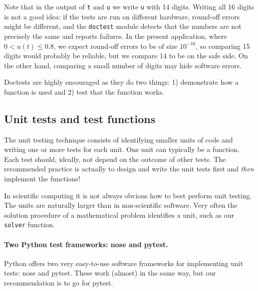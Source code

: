 \documentclass[graybox,sectrefs,envcountresetchap,open=right,final]{svmonodo}
\newenvironment{warning_mdfboxadmon}[1][]{
\begin{warning_mdfboxmdframed}[frametitle=#1]
}
{
\end{warning_mdfboxmdframed}
}
\begin{document}
\begin{warning_mdfboxadmon}
Note that in the output of \texttt{t} and \texttt{u} we write \texttt{u} with 14 digits.
Writing all 16 digits is not a good idea: if the tests are run on
different hardware, round-off errors might be different, and
the \texttt{doctest} module detects that the numbers are not precisely the same
and reports failures. In the present application, where $0 < u(t) \leq 0.8$,
we expect round-off errors to be of size $10^{-16}$, so comparing 15
digits would probably be reliable, but we compare 14 to be on the
safe side. On the other hand, comparing a small number of digits may
hide software errors.
\end{warning_mdfboxadmon}



Doctests are highly encouraged as they do two things: 1) demonstrate
how a function is used and 2) test that the function works.


\subsection{Unit tests and test functions}
\label{softeng1:verify:pytest}


The unit testing technique consists of identifying smaller units
of code and writing one or more tests for
each unit. One unit can typically be a function.
Each test should, ideally, not depend on the outcome of
other tests. The recommended practice is actually to
design and write the unit tests first and \emph{then} implement the functions!

In scientific computing it is not always obvious how to best perform
unit testing. The units are naturally larger than in non-scientific
software. Very often the solution procedure of a mathematical problem
identifies a unit, such as our \texttt{solver} function.


\paragraph{Two Python test frameworks: nose and pytest.}
Python offers two very easy-to-use software frameworks for implementing
unit tests: nose and pytest. These work (almost) in the same way,
but our recommendation is to go for pytest.
\end{document}
